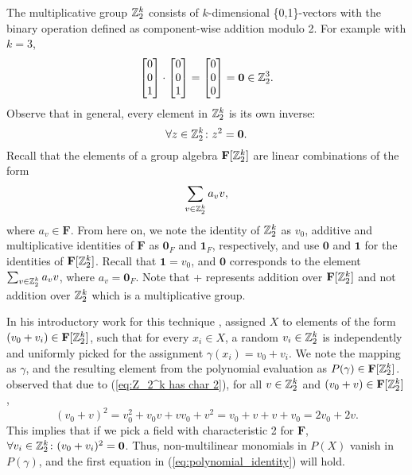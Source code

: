 The multiplicative group $\mathbb Z_2^k$ consists of $k$-dimensional \{0,1\}-vectors 
with the binary operation defined as component-wise addition modulo 2. 
For example with $k = 3$, 
\[
  \begin{bmatrix} 0 \\ 0 \\ 1 \end{bmatrix} \cdot 
  \begin{bmatrix} 0 \\ 0 \\ 1 \end{bmatrix} =
  \begin{bmatrix} 0 \\ 0 \\ 0 \end{bmatrix} = \mathbf{0} \in \mathbb Z_2^3.
\]
Observe that in general, every element in $\mathbb Z_2^k$ is its own inverse:
\begin{equation}
  \label{eq:Z_2^k has char 2}
  \forall z \in \mathbb Z_2^k \colon z^2 = \mathbf{0}.
\end{equation}
Recall that the elements of a group algebra 
$\mathbf{F}[\mathbb Z_2^k]$ are linear combinations of the form 
\[
  \displaystyle \sum_{v \in \mathbb Z_2^k}a_v v,
\]
where $a_v \in \mathbf{F}$. From here on, we note the identity of $\mathbb Z_2^k$ as $v_0$, additive and 
multiplicative identities of $\mathbf{F}$ as $\mathbf{0}_F$ and $\mathbf{1}_F$, respectively, and 
use $\mathbf{0}$ and $\mathbf{1}$ for the identities of 
$\mathbf{F}[\mathbb Z_2^k]$. Recall that $\mathbf{1} = v_0$, and
$\mathbf{0}$ corresponds to the element $\sum_{v \in \mathbb Z_2^k}a_v v$, where $a_v =
\mathbf{0}_F$. Note that + represents addition over $\mathbf{F}[\mathbb Z_2^k]$ and not 
addition over $\mathbb Z_2^k$ which is a multiplicative group.

In his introductory work for this technique \cite{Koutis08}, 
\citeauthor{Koutis08} assigned $X$ 
to elements of the form $(v_0 + v_i) \in \mathbf{F}[\mathbb Z_2^k]$, 
such that for every $x_i \in X$, a random $v_i \in \mathbb Z_2^k$ is independently and uniformly 
picked for the assignment 
$\gamma(x_i) = v_0 + v_i$. %
We note the mapping as $\gamma$, and the resulting element  
from the polynomial evaluation 
as $P(\gamma) \in \mathbf{F}[\mathbb Z_2^k]$. 
\citeauthor{Koutis08} observed that 
due to (\ref{eq:Z_2^k has char 2}), for all $v \in \mathbb Z_2^k$ and $(v_0 + v) \in \mathbf{F}[\mathbb Z_2^k]$, 
\[
  (v_0 + v)^2 = v_0^2 + v_0v + vv_0 + v^2 = v_0 + v + v + v_0 = 2v_0 + 2v.
\]
This implies that if we pick a field with characteristic 2 for $\mathbf{F}$, 
$\forall v_i \in \mathbb Z_2^k \colon (v_0 + v_i)^2 = \mathbf{0}$. Thus, 
non-multilinear monomials in $P(X)$ vanish in $P(\gamma)$, and the 
first equation in (\ref{eq:polynomial_identity}) 
will hold.

